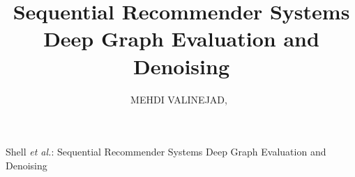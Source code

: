 \documentclass[journal]{IEEEtran}
\begin{document}
%
\title{Sequential Recommender Systems Deep Graph Evaluation and Denoising}
%
%
%

\author{MEHDI VALINEJAD,~%
}

% 
%



%
{Shell \MakeLowercase{\textit{et al.}}: Sequential Recommender Systems Deep Graph Evaluation and Denoising}
% 
\end{document}
